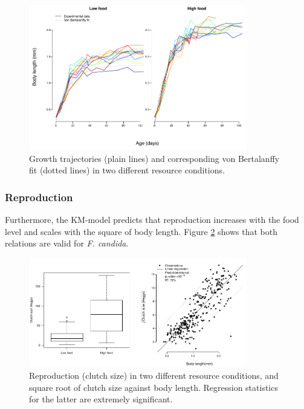 \begin{figure}[!h] %
\centering
\includegraphics[width=0.85\textwidth]{4_ChapThe1/Fig/FigSM1.pdf} 
\caption[Experimental growth
trajectories]{Growth
trajectories (plain lines) and corresponding von Bertalanffy fit  (dotted lines) in two different resource conditions.}
\label{Fig4-SM1}
\end{figure}

\subsubsection{Reproduction}

Furthermore, the KM-model predicts that reproduction increases with the food
level and scales with the square of body length. Figure \ref{Fig4-SM2} shows
that both relations are valid for \textit{F. candida}.

\begin{figure}[!h] %
\centering
\includegraphics[width=0.85\textwidth]{4_ChapThe1/Fig/FigSM2.pdf}
\caption[Experimental measure
of reproduction]{Reproduction (clutch size) in two different resource
conditions, and square root of clutch size against body length. Regression statistics for the latter are extremely significant.}
\label{Fig4-SM2}
\end{figure}

